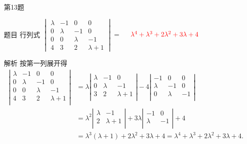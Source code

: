 \documentclass[aspectratio=169]{beamer}
\begin{document}
\begin{frame}{第13题}
\begin{block}{题目}
行列式 \(\begin{vmatrix}
\lambda & -1 & 0 & 0 \\
0 & \lambda & -1 & 0 \\
0 & 0 & \lambda & -1 \\
4 & 3 & 2 & \lambda+1
\end{vmatrix} =\) \underline{$\quad \textcolor{red}{\lambda^{4}+\lambda^{3}+2\lambda^{2}+3\lambda+4} \quad$} 
\end{block}

\begin{block}{解析}
按第一列展开得
\begin{align*}
\left| \begin{matrix}
\lambda&		-1&		0&		0\\
0&		\lambda&		-1&		0\\
0&		0&		\lambda&		-1\\
4&		3&		2&		\lambda +1\\
\end{matrix} \right|&=\lambda \left| \begin{matrix}
\lambda&		-1&		0\\
0&		\lambda&		-1\\
3&		2&		\lambda +1\\
\end{matrix} \right|-4\left| \begin{matrix}
-1&		0&		0\\
\lambda&		-1&		0\\
0&		\lambda&		-1\\
\end{matrix} \right|\\
&=\lambda ^2\left| \begin{matrix}
\lambda&		-1\\
2&		\lambda +1\\
\end{matrix} \right|+3\lambda \left| \begin{matrix}
-1&		0\\
\lambda&		-1\\
\end{matrix} \right|+4
\\
&=\lambda ^3\left( \lambda +1 \right) +2\lambda ^2+3\lambda +4=\lambda ^4+\lambda ^3+2\lambda ^2+3\lambda +4.
\end{align*}
\end{block}
\end{frame}
\end{document}
